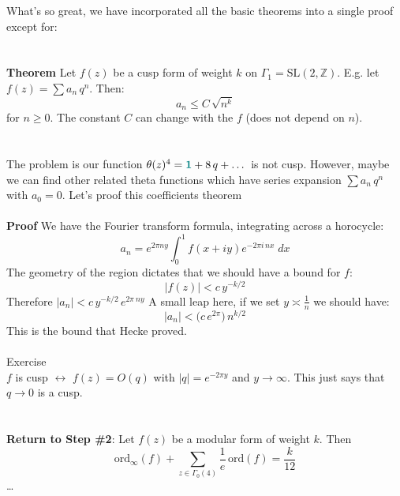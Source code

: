 \documentclass[12pt]{article}
\begin{document}
\noindent What's so great, we have incorporated all the basic theorems into a single proof except for: \\ \\ \\
\textbf{Theorem }Let $f(z)$ be a cusp form of weight $k$ on $\Gamma_1 = \mathrm{SL}(2, \mathbb{Z})$.  E.g. let $f(z) = \sum a_n \, q^n$.  Then:
$$ a_n \leq C \, \sqrt{n^k}  $$
for $n \geq 0$.  The constant $C$ can change with the $f$ (does not depend on $n$). \\ \\ \\
The problem is our function $\theta(z)^4 = {\color{green!50!blue}\mathbf{1}} + 8 \, q + \dots $ is not cusp.  However, maybe we can find other related theta functions which have series expansion $\sum a_n \, q^n$ with $a_0 = 0$.  Let's proof this coefficients theorem \\ \\
\textbf{Proof} We have the Fourier transform formula, integrating across a horocycle:
$$ a_n = e^{2\pi n y} \int_0^1 f(x + iy) e^{- 2\pi i \, n x} \; dx  $$
The geometry of the region dictates that we should have a bound for $f$:
$$ \big|f(z)\big| < c \, y^{-k/2} $$
Therefore $|a_n| <  c  \, y^{-k/2} \, e^{2\pi \ ny } $ A small leap here, if we set $y \asymp \frac{1}{n}$ we should have:
$$ |a_n| < \big( c \, e^{2\pi} \big) \, n^{k/2} $$
This is the bound that Hecke proved. \\ \\
{\color{red!50!green}Exercise} \\ 
$f$ is cusp $\leftrightarrow$ $f(z) = O(q)$ with $|q| = e^{-2\pi y }$ and $y \to \infty$.  \hfill This just says that $q \to 0$ is a cusp. \\ \\ \\
\textbf{Return to Step \#2}: Let $f(z)$ be a modular form of weight $k$.  Then
$$ \text{ord}_\infty (f) + \sum_{z \in \Gamma_0(4)}  \frac{1}{e} \, \text{ord} (f) = \frac{k}{12} $$ \dots

\newpage
\end{document}
